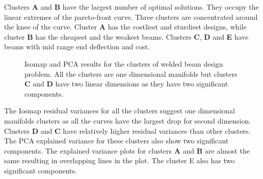 Clusters \textbf{A} and \textbf{B} have the largest number of optimal
solutions. They occupy the linear extremes of the pareto-front curve. Three
clusters are concentrated around the knee of the curve. Cluster \textbf{A}
has the costliest and sturdiest designs, while cluster \textbf{B} has the
cheapest and the weakest beams. Clusters \textbf{C}, \textbf{D} and
\textbf{E} have beams with mid range end deflection and cost.


\begin{figure}[ht]\begin{center}
\caption{Isomap and PCA results for the clusters of welded beam design
  problem. All the clusters are one dimensional manifolds but clusters
  \textbf{C} and \textbf{D} have two linear dimensions as they have two
  significant components.}
 \label{wbeamClustersVar}
\end{center}\end{figure}

The Iosmap residual variances for all the clusters suggest one dimensional
manifolds clusters as all the curves have the largest drop for second
dimension. Clusters \textbf{D} and \textbf{C} have relatively higher
residual variances than other clusters. The PCA explained variance for
these clusters also show two significant components. The explained variance
plots for clusters \textbf{A} and \textbf{B} are almost the same resulting
in overlapping lines in the plot. The cluster E also has two significant
components.


